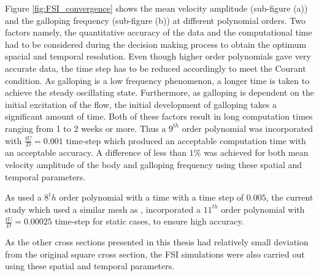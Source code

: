 Figure \ref{fig:FSI_convergence} shows the mean velocity amplitude (sub-figure (a)) and the galloping frequency (sub-figure (b)) at different polynomial orders. Two factors namely, the quantitative accuracy of the data and the computational time had to be considered during the decision making process to obtain the optimum spacial and temporal resolution. Even though higher order polynomials gave very accurate data, the time step has to be reduced accordingly to meet the Courant condition. As galloping is a low frequency phenomenon, a longer time is taken to achieve the steady oscillating state. Furthermore, as galloping is dependent on the initial excitation of the flow, the initial development of galloping takes a significant amount of time. Both of these factors result in long computation times ranging from 1 to 2 weeks or more. Thus a $9^{th}$ order polynomial was incorporated with $\frac{tU}{D}=0.001$ time-step which produced an acceptable computation time with an acceptable accuracy. A difference of less than $1\%$ was achieved for both mean velocity amplitude  of the body and galloping frequency using these spatial and temporal parameters.

As \citet{Leontini2013}  used a $8^th$ order polynomial with a time with a time step of $0.005$, the current study which used a similar mesh as \citet{Leontini2013}, incorporated a $11^{th}$ order polynomial with $\frac{tU}{D}=0.00025$ time-step for static cases, to ensure high accuracy.

As the other cross sections presented in this thesis had relatively small deviation from the original square cross section, the FSI simulations were also carried out using these spatial and temporal parameters.     















